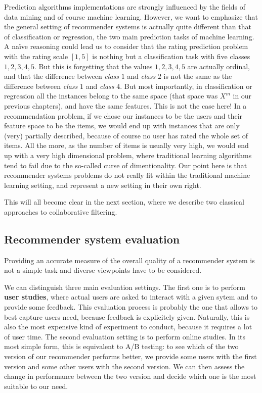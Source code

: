Prediction algorithms implementations are strongly influenced by the fields of
data mining and of course machine learning. However, we want to emphasize that
the general setting of recommender systems is actually quite different than
that of classification or regression, the two main prediction tasks of machine
learning. A naïve reasoning could lead us to consider that the rating
prediction problem with the rating scale $[1, 5]$ is nothing but a
classification task with five classes $1, 2, 3, 4, 5$. But this is forgetting
that the values $1, 2, 3, 4, 5$ are actually ordinal, and that the difference
between \textit{class} $1$ and \textit{class} $2$ is not the same as the
difference between \textit{class} $1$ and \textit{class} $4$. But most
importantly, in classification or regression all the instances belong to the
same space (that space was $X^m$ in our previous chapters), and have the same
features. This is not the case here! In a recommendation problem, if we chose
our instances to be the users and their feature space to be the items, we would
end up with instances that are only (very) partially described, because of
course no user has rated the whole set of items. All the more, as the number of
items is usually very high, we would end up with a very high dimensional
problem, where traditional learning algorithms tend to fail due to the
so-called curse of dimentionality. Our point here is that recommender systems
problems do not really fit within the traditional machine learning setting, and
represent a new setting in their own right.

This will all become clear in the next section, where we describe two classical
approaches to collaborative filtering.

\subsection{Recommender system evaluation}
\label{SEC:Recommender_system_evaluation}
Providing an accurate measure of the overall quality of a recommender system is
not a simple task and diverse viewpoints have to be considered.

We can distinguish three main evaluation settings. The first one is to perform
\textbf{user studies}, where actual users are asked to interact with a given sytem and to
provide some feedback. This evaluation process is probably the one that allows
to best capture users need, because feedback is explicitely given. Naturally,
this is also the most expensive kind of experiment to conduct, because it
requires a lot of user time. The second evaluation setting is to perform online
studies. In its most simple form, this is equivalent to A/B testing: to see
which of the two version of our recommender performs better, we provide some
users with the first version and some other users with the second version. We
can then assess the change in performance between the two version and decide
which one is the most suitable to our need.

